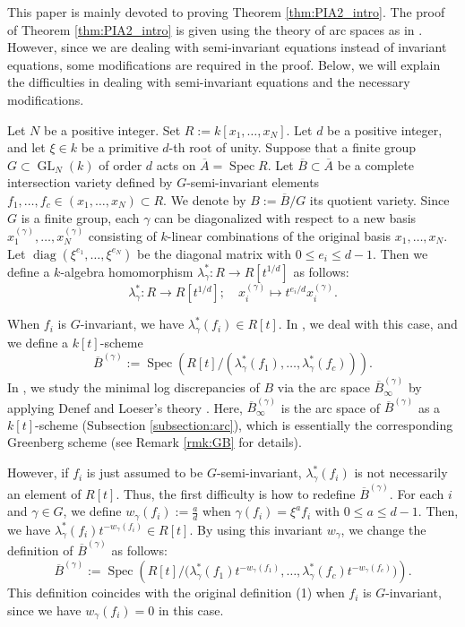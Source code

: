 \documentclass[a4paper,11pt]{amsart}
\theoremstyle{definition}
\theoremstyle{remark}
\begin{document}
This paper is mainly devoted to proving Theorem \ref{thm:PIA2_intro}. 
The proof of Theorem \ref{thm:PIA2_intro} is given using the theory of arc spaces as in \cite{NS22}. 
However, since we are dealing with semi-invariant equations instead of invariant equations, some modifications are required in the proof. 
Below, we will explain the difficulties in dealing with semi-invariant equations and the necessary modifications. 

Let $N$ be a positive integer. Set $R := k[x_1, \ldots , x_N]$. 
Let $d$ be a positive integer, and let $\xi \in k$ be a primitive $d$-th root of unity. 
Suppose that a finite group $G \subset \operatorname{GL}_N(k)$ of order $d$ acts on $\overline{A} = \operatorname{Spec} R$. 
Let $\overline{B} \subset \overline{A}$ be a complete intersection variety defined by $G$-semi-invariant elements $f_1,\ldots,f_c \in (x_1, \ldots, x_N) \subset R$. 
We denote by $B := \overline{B}/G$ its quotient variety. 
Since $G$ is a finite group, each $\gamma$ can be diagonalized with respect to a new basis $x_1^{(\gamma)}, \ldots, x_N^{(\gamma)}$ consisting of $k$-linear combinations of the original basis $x_1, \ldots , x_N$.
Let $\operatorname{diag} \left( \xi ^{e_1}, \ldots , \xi ^{e_N} \right)$ be the diagonal matrix 
with $0 \le e_i \le d-1$. 
Then we define a $k$-algebra homomorphism ${\lambda}^* _{\gamma}:R \to R[t^{1/d}]$ as follows:
\[
{\lambda}^* _{\gamma}: R \to R[t^{1/d}]; 
\quad x_i^{(\gamma)} \mapsto t^{e_i/d}x_i^{(\gamma)}. 
\]

When $f_i$ is $G$-invariant, we have $\lambda ^* _{\gamma}(f_i) \in R[t]$. 
In \cite{NS22}, we deal with this case, and we define a $k[t]$-scheme
\[\tag{1}
\overline{B}^{(\gamma)} 
:= \operatorname{Spec} \left( R[t]/\left( \lambda ^* _{\gamma}(f_1), \ldots , \lambda ^* _{\gamma}(f_c) \right) \right ). 
\]
In \cite{NS22}, we study the minimal log discrepancies of $B$ via the arc space $\overline{B}^{(\gamma)} _{\infty}$ by applying Denef and Loeser's theory \cite{DL02}.
Here, $\overline{B}^{(\gamma)} _{\infty}$ is the arc space of $\overline{B}^{(\gamma)}$ as a $k[t]$-scheme (Subsection \ref{subsection:arc}), which is essentially the corresponding Greenberg scheme (see Remark \ref{rmk:GB} for details).

However, if $f_i$ is just assumed to be $G$-semi-invariant, $\lambda ^* _{\gamma}(f_i)$ is not necessarily an element of $R[t]$.
Thus, the first difficulty is how to redefine $\overline{B}^{(\gamma)}$. 
For each $i$ and $\gamma \in G$, we define $w_\gamma(f_i):=\frac{a}{d}$ when $\gamma (f_i) =\xi^a f_i$ with $0 \le a \le d-1$. 
Then, we have $\lambda ^* _{\gamma}(f_i)t^{-w_\gamma(f_i)} \in R[t]$. 
By using this invariant $w_{\gamma}$, we change the definition of $\overline{B}^{(\gamma)}$ as follows: 
\[
\overline{B}^{(\gamma)} 
:= \operatorname{Spec} \left(R[t]/ \bigl( \lambda ^* _{\gamma}(f_1)t^{-w_\gamma(f_1)}, \ldots , \lambda ^* _{\gamma}(f_c)t^{-w_\gamma(f_c)} \bigr)\right).
\]
This definition coincides with the original definition (1) when $f_i$ is $G$-invariant, 
since we have $w_\gamma(f_i) = 0$ in this case.
\end{document}
